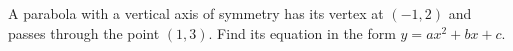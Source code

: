 A parabola with a vertical axis of symmetry has its vertex at $(-1,2)$ and passes through the point $(1,3)$. Find its equation in the form $y=ax^2+bx+c$.

